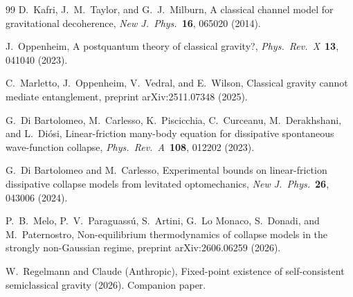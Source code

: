 \documentclass[12pt,a4paper]{article}
\theoremstyle{remark}
\begin{document}
\begin{thebibliography}{99}
 D.~Kafri, J.~M.~Taylor, and G.~J.~Milburn, A classical channel model for
gravitational decoherence, \textit{New J.\ Phys.}\ \textbf{16}, 065020 (2014).

 J.~Oppenheim, A postquantum theory of classical gravity?,
\textit{Phys.\ Rev.\ X}\ \textbf{13}, 041040 (2023).

 C.~Marletto, J.~Oppenheim, V.~Vedral, and E.~Wilson,
Classical gravity cannot mediate entanglement,
preprint arXiv:2511.07348 (2025).

 G.~Di Bartolomeo, M.~Carlesso, K.~Piscicchia, C.~Curceanu,
M.~Derakhshani, and L.~Di\'osi, Linear-friction many-body equation for dissipative
spontaneous wave-function collapse, \textit{Phys.\ Rev.\ A}\ \textbf{108}, 012202 (2023).

 G.~Di Bartolomeo and M.~Carlesso, Experimental bounds on
linear-friction dissipative collapse models from levitated optomechanics,
\textit{New J.\ Phys.}\ \textbf{26}, 043006 (2024).

 P.~B.~Melo, P.~V.~Paraguass\'u, S.~Artini, G.~Lo Monaco,
S.~Donadi, and M.~Paternostro, Non-equilibrium thermodynamics of collapse models in the
strongly non-Gaussian regime, preprint arXiv:2606.06259 (2026).

 W.~Regelmann and Claude (Anthropic), Fixed-point existence of
self-consistent semiclassical gravity (2026). Companion paper.

\end{thebibliography}
\end{document}
